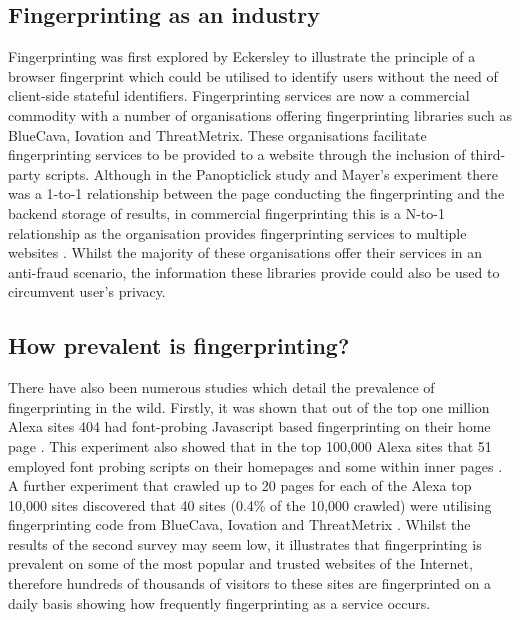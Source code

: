 \documentclass[12pt]{article}
\begin{document}
\subsection{Fingerprinting as an industry}
Fingerprinting was first explored by Eckersley \parencite{uniqueBrowser} to illustrate the principle of a browser fingerprint which could be utilised to identify users without the need of client-side stateful identifiers. Fingerprinting services are now a commercial commodity with a number of organisations offering fingerprinting libraries such as BlueCava, Iovation and ThreatMetrix. These organisations facilitate fingerprinting services to be provided to a website through the inclusion of third-party scripts. Although in the Panopticlick study \parencite{uniqueBrowser} and Mayer's experiment \parencite{mayer09} there was a 1-to-1 relationship between the page conducting the fingerprinting and the backend storage of results, in commercial fingerprinting this is a N-to-1 relationship as the organisation provides fingerprinting services to multiple websites \parencite{cookielessMonster}. Whilst the majority of these organisations offer their services in an anti-fraud scenario, the information these libraries provide could also be used to circumvent user's privacy. \\

\subsection{How prevalent is fingerprinting?}
There have also been numerous studies which detail the prevalence of fingerprinting in the wild. Firstly, it was shown that out of the top one million Alexa sites 404 had font-probing Javascript based fingerprinting on their home page \parencite{dustingFP}. This experiment also showed that in the top 100,000 Alexa sites that 51 employed font probing scripts on their homepages and some within inner pages \parencite{dustingFP}. A further experiment that crawled up to 20 pages for each of the Alexa top 10,000 sites discovered that 40 sites (0.4\% of the 10,000 crawled) were utilising fingerprinting code from BlueCava, Iovation and ThreatMetrix \parencite{cookielessMonster}. Whilst the results of the second survey may seem low, it illustrates that fingerprinting is prevalent on some of the most popular and trusted websites of the Internet, therefore hundreds of thousands of visitors to these sites are fingerprinted on a daily basis \parencite{cookielessMonster} showing how frequently fingerprinting as a service occurs.  \\ 
\end{document}
